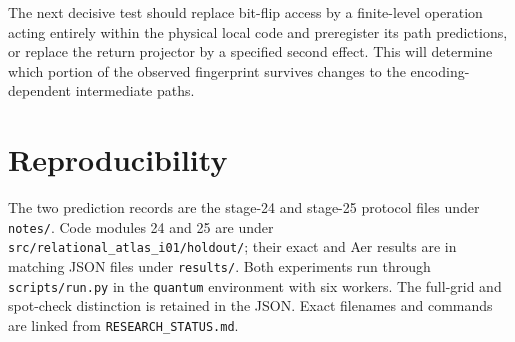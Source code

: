 \documentclass[10pt,a4paper]{article}
\begin{document}
The next decisive test should replace bit-flip access by a finite-level operation acting entirely within the physical local code and preregister its path predictions, or replace the return projector by a specified second effect. This will determine which portion of the observed fingerprint survives changes to the encoding-dependent intermediate paths.

\section*{Reproducibility}
The two prediction records are the stage-24 and stage-25 protocol files under \texttt{notes/}. Code modules 24 and 25 are under \texttt{src/relational\_atlas\_i01/holdout/}; their exact and Aer results are in matching JSON files under \texttt{results/}. Both experiments run through \texttt{scripts/run.py} in the \texttt{quantum} environment with six workers. The full-grid and spot-check distinction is retained in the JSON. Exact filenames and commands are linked from \texttt{RESEARCH\_STATUS.md}.
\end{document}
